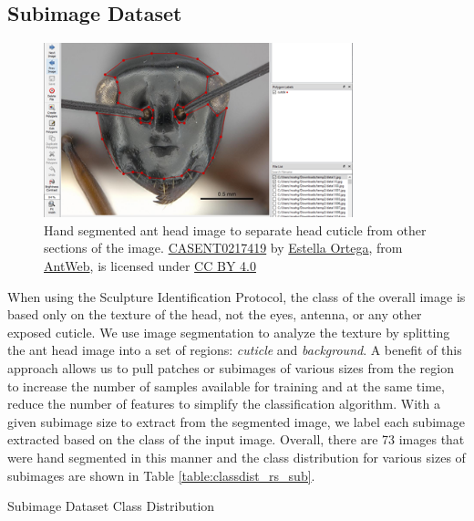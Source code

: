\documentclass{aci}
\begin{document}
\subsection{Subimage Dataset}

\begin{figure}[h]
  \centering
  \includegraphics[width=0.8\textwidth]{assets/images/segmented_1.png}
  \caption{Hand segmented ant head image to separate head cuticle from other
    sections of the image.
    \href{https://www.antweb.org/bigPicture.do?name=casent0217419&shot=h&number=1}{CASENT0217419}
    by \href{https://www.antweb.org/artist.do?id=92}{Estella Ortega}, from
    \href{https://www.antweb.org}{AntWeb}, is licensed under
    \href{https://creativecommons.org/licenses/by/4.0/}{CC BY 4.0}}
  \label{fig:segmented_1}
\end{figure}

When using the Sculpture Identification Protocol, the class of the overall image
is based only on the texture of the head, not the eyes, antenna, or any other
exposed cuticle. We use image segmentation to analyze the texture by splitting
the ant head image into a set of regions: \textit{cuticle} and
\textit{background}. A benefit of this approach allows us to pull patches or
subimages of various sizes from the region to increase the number of samples
available for training and at the same time, reduce the number of features to
simplify the classification algorithm. With a given subimage size to extract
from the segmented image, we label each subimage extracted based on the class of
the input image. Overall, there are 73 images that were hand segmented in this
manner and the class distribution for various sizes of subimages are shown in
Table \ref{table:classdist_rs_sub}.

\begin{table}[h]
  \centering
  \caption{Subimage Dataset Class Distribution}
  \label{table:classdist_rs_sub}
  
\end{table}
\end{document}
